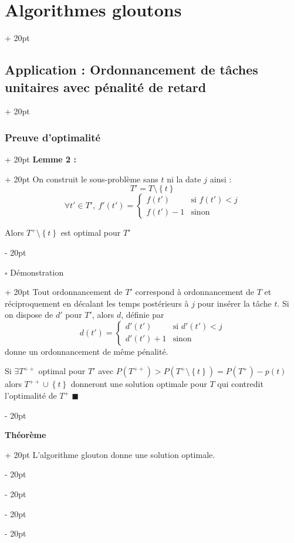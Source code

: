 \documentclass[a4paper, 12pt, twoside]{article}
\newcommand{\set}[1]{\left\{ #1 \right\}}
\newcommand{\ind}[1][20pt]{\advance\leftskip + #1}
\newcommand{\deind}[1][20pt]{\advance\leftskip - #1}
\newenvironment{indt}[2][20pt]{#2 \par \ind[#1]}{\par \deind} %
\begin{document}
\begin{indt}{\section{Algorithmes gloutons}}
\begin{indt}{\subsection{Application : Ordonnancement de tâches unitaires avec pénalité de retard}}
\begin{indt}{\subsubsection{Preuve d'optimalité}}
\begin{indt}{\textbf{Lemme 2 :}}
                    On construit le sous-problème sans $t$ ni la date $j$ ainsi :
                        \[ T' = T \setminus \set t \]
                        \[
                            \forall t' \in T',\ f'(t') =
                            \left\{\!\!
                            \begin{array}{ll}
                                f(t') & \text{si $f(t') < j$}
                                \\
                                f(t') - 1 & \text{sinon}
                            \end{array}
                            \right.
                        \]
                    
                    Alors $T^+ \setminus \set t$ est optimal pour $T'$
                \end{indt}
                
                \vspace{12pt}
                
                \begin{indt}{$\square$ Démonstration}
                    Tout ordonnancement de $T'$ correspond à ordonnancement de $T$ et réciproquement en décalant les temps postérieurs à $j$ pour insérer la tâche $t$. Si on dispose de $d'$ pour $T'$, alors $d$, définie par
                        \[
                            d(t') =
                            \left\{\!\!
                            \begin{array}{ll}
                                d'(t') & \text{si $d'(t') < j$}
                                \\
                                d'(t') + 1 & \text{sinon}
                            \end{array}
                            \right.
                        \]
                    donne un ordonnancement de même pénalité.
                    
                    Si $\exists T^{++}$ optimal pour $T'$ avec $P(T^{++}) > P(T^+ \setminus \set t) = P(T^+) - p(t)$
                    alors $T^{++} \cup \set t$ donneront une solution optimale pour $T$ qui contredit l'optimalité de $T^+$
                    $\blacksquare$
                \end{indt}
                
                \vspace{12pt}
                
                \begin{indt}{\textbf{Théorème}}
                    L'algorithme glouton donne une solution optimale.
                \end{indt}
                

\end{indt}
\end{indt}
\end{indt}
\end{document}
